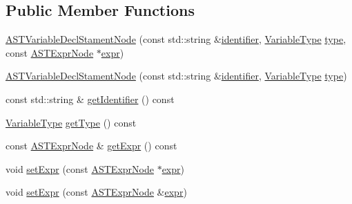 \subsection*{Public Member Functions}
\begin{DoxyCompactItemize}
\item 
\hyperlink{classparser_1_1ast_1_1ASTVariableDeclStamentNode_a614793e4f5b9338d2636d8272a766c59}{A\+S\+T\+Variable\+Decl\+Stament\+Node} (const std\+::string \&\hyperlink{classparser_1_1ast_1_1ASTVariableDeclStamentNode_a998b3de9773131301fc68f7d053ff4b3}{identifier}, \hyperlink{ASTVariableDeclStamentNode_8h_a1e8e1bde0729627e3a22ffa858d5f3b9}{Variable\+Type} \hyperlink{classparser_1_1ast_1_1ASTVariableDeclStamentNode_af7926565361da558b12fe6d1acdc1a1d}{type}, const \hyperlink{classparser_1_1ast_1_1ASTExprNode}{A\+S\+T\+Expr\+Node} $\ast$\hyperlink{classparser_1_1ast_1_1ASTVariableDeclStamentNode_a59f706f678b436b518652776a9593ae7}{expr})
\item 
\hyperlink{classparser_1_1ast_1_1ASTVariableDeclStamentNode_a4dae61d09818731fb35776eaf0574407}{A\+S\+T\+Variable\+Decl\+Stament\+Node} (const std\+::string \&\hyperlink{classparser_1_1ast_1_1ASTVariableDeclStamentNode_a998b3de9773131301fc68f7d053ff4b3}{identifier}, \hyperlink{ASTVariableDeclStamentNode_8h_a1e8e1bde0729627e3a22ffa858d5f3b9}{Variable\+Type} \hyperlink{classparser_1_1ast_1_1ASTVariableDeclStamentNode_af7926565361da558b12fe6d1acdc1a1d}{type})
\item 
const std\+::string \& \hyperlink{classparser_1_1ast_1_1ASTVariableDeclStamentNode_a12050d4fc8fff18ddc605642013b8eb4}{get\+Identifier} () const
\item 
\hyperlink{ASTVariableDeclStamentNode_8h_a1e8e1bde0729627e3a22ffa858d5f3b9}{Variable\+Type} \hyperlink{classparser_1_1ast_1_1ASTVariableDeclStamentNode_a78eb935a42c6850bb965d9909cb35d79}{get\+Type} () const
\item 
const \hyperlink{classparser_1_1ast_1_1ASTExprNode}{A\+S\+T\+Expr\+Node} \& \hyperlink{classparser_1_1ast_1_1ASTVariableDeclStamentNode_a7275ed311f4ec6d6b28e5ab9804fa8fd}{get\+Expr} () const
\item 
void \hyperlink{classparser_1_1ast_1_1ASTVariableDeclStamentNode_a01a4ffd87fd267a4cf592c56c9b1eda6}{set\+Expr} (const \hyperlink{classparser_1_1ast_1_1ASTExprNode}{A\+S\+T\+Expr\+Node} $\ast$\hyperlink{classparser_1_1ast_1_1ASTVariableDeclStamentNode_a59f706f678b436b518652776a9593ae7}{expr})
\item 
void \hyperlink{classparser_1_1ast_1_1ASTVariableDeclStamentNode_a3c075b31e47c5f527bf16bc783a67181}{set\+Expr} (const \hyperlink{classparser_1_1ast_1_1ASTExprNode}{A\+S\+T\+Expr\+Node} \&\hyperlink{classparser_1_1ast_1_1ASTVariableDeclStamentNode_a59f706f678b436b518652776a9593ae7}{expr})
\end{DoxyCompactItemize}
